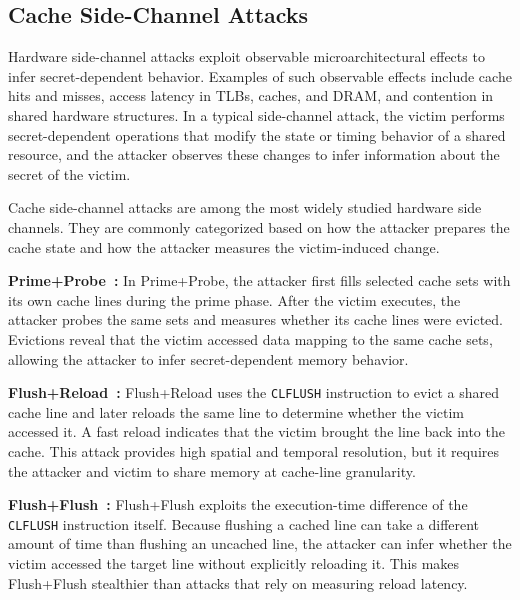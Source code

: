 \subsection{Cache Side-Channel Attacks}
\label{sec:back_sidechannel}
Hardware side-channel attacks exploit observable microarchitectural effects to infer secret-dependent behavior.
Examples of such observable effects include cache hits and misses, access latency in TLBs, caches, and DRAM, and contention in shared hardware structures.
In a typical side-channel attack, the victim performs secret-dependent operations that modify the state or timing behavior of a shared resource, and the attacker observes these changes to infer information about the secret of the victim.

Cache side-channel attacks are among the most widely studied hardware side channels.
They are commonly categorized based on how the attacker prepares the cache state and how the attacker measures the victim-induced change.

\textbf{Prime+Probe~\cite{liu2015last,schwarz2017malware, brasser2017software,kayaalp2016high,aciiccmez2008vulnerability,tromer2010efficient,osvik2006cache,neve2006advances}:}
In Prime+Probe, the attacker first fills selected cache sets with its own cache lines during the prime phase.
After the victim executes, the attacker probes the same sets and measures whether its cache lines were evicted.
Evictions reveal that the victim accessed data mapping to the same cache sets, allowing the attacker to infer secret-dependent memory behavior.

\textbf{Flush+Reload~\cite{gullasch2011cache,gruss2015cache,zhang2014cross,yarom2014recovering,van2015just,irazoqui2014wait,yarom2014flush+}:}
Flush+Reload uses the \texttt{CLFLUSH} instruction to evict a shared cache line and later reloads the same line to determine whether the victim accessed it.
A fast reload indicates that the victim brought the line back into the cache.
This attack provides high spatial and temporal resolution, but it requires the attacker and victim to share memory at cache-line granularity.

\textbf{Flush+Flush~\cite{gruss2016flush+}:}
Flush+Flush exploits the execution-time difference of the \texttt{CLFLUSH} instruction itself.
Because flushing a cached line can take a different amount of time than flushing an uncached line, the attacker can infer whether the victim accessed the target line without explicitly reloading it.
This makes Flush+Flush stealthier than attacks that rely on measuring reload latency.

